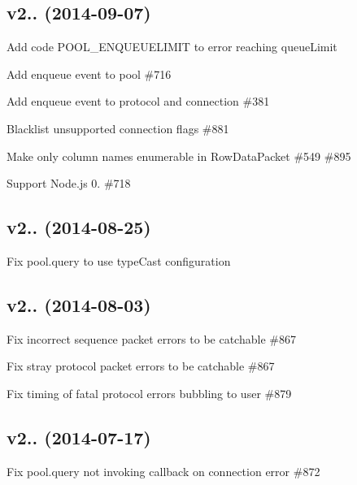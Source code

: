\subsection*{v2.. (2014-\/09-\/07)}


\begin{DoxyItemize}
\item Add code {\ttfamily P\+O\+O\+L\+\_\+\+E\+N\+Q\+U\+E\+U\+E\+L\+I\+M\+I\+T} to error reaching {\ttfamily queue\+Limit}
\item Add {\ttfamily enqueue} event to pool \#716
\item Add {\ttfamily enqueue} event to protocol and connection \#381
\item Blacklist unsupported connection flags \#881
\item Make only column names enumerable in {\ttfamily Row\+Data\+Packet} \#549 \#895
\item Support Node.\+js 0. \#718
\end{DoxyItemize}

\subsection*{v2.. (2014-\/08-\/25)}


\begin{DoxyItemize}
\item Fix {\ttfamily pool.\+query} to use {\ttfamily type\+Cast} configuration
\end{DoxyItemize}

\subsection*{v2.. (2014-\/08-\/03)}


\begin{DoxyItemize}
\item Fix incorrect sequence packet errors to be catchable \#867
\item Fix stray protocol packet errors to be catchable \#867
\item Fix timing of fatal protocol errors bubbling to user \#879
\end{DoxyItemize}

\subsection*{v2.. (2014-\/07-\/17)}


\begin{DoxyItemize}
\item Fix {\ttfamily pool.\+query} not invoking callback on connection error \#872
\end{DoxyItemize}

